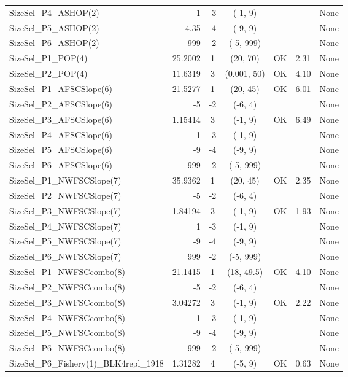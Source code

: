 \documentclass[12pt,]{article}
\begin{document}
\begin{landscape}
\begin{longtable}{lrcccll}
  SizeSel\_P4\_ASHOP(2) & 1 & -3 & (-1, 9) &  &  & None \\ 
  SizeSel\_P5\_ASHOP(2) & -4.35 & -4 & (-9, 9) &  &  & None \\ 
  SizeSel\_P6\_ASHOP(2) & 999 & -2 & (-5, 999) &  &  & None \\ 
  SizeSel\_P1\_POP(4) & 25.2002 & 1 & (20, 70) & OK & 2.31 & None \\ 
  SizeSel\_P2\_POP(4) & 11.6319 & 3 & (0.001, 50) & OK & 4.10 & None \\ 
  SizeSel\_P1\_AFSCSlope(6) & 21.5277 & 1 & (20, 45) & OK & 6.01 & None \\ 
  SizeSel\_P2\_AFSCSlope(6) & -5 & -2 & (-6, 4) &  &  & None \\ 
  SizeSel\_P3\_AFSCSlope(6) & 1.15414 & 3 & (-1, 9) & OK & 6.49 & None \\ 
  SizeSel\_P4\_AFSCSlope(6) & 1 & -3 & (-1, 9) &  &  & None \\ 
  SizeSel\_P5\_AFSCSlope(6) & -9 & -4 & (-9, 9) &  &  & None \\ 
  SizeSel\_P6\_AFSCSlope(6) & 999 & -2 & (-5, 999) &  &  & None \\ 
  SizeSel\_P1\_NWFSCSlope(7) & 35.9362 & 1 & (20, 45) & OK & 2.35 & None \\ 
  SizeSel\_P2\_NWFSCSlope(7) & -5 & -2 & (-6, 4) &  &  & None \\ 
  SizeSel\_P3\_NWFSCSlope(7) & 1.84194 & 3 & (-1, 9) & OK & 1.93 & None \\ 
  SizeSel\_P4\_NWFSCSlope(7) & 1 & -3 & (-1, 9) &  &  & None \\ 
  SizeSel\_P5\_NWFSCSlope(7) & -9 & -4 & (-9, 9) &  &  & None \\ 
  SizeSel\_P6\_NWFSCSlope(7) & 999 & -2 & (-5, 999) &  &  & None \\ 
  SizeSel\_P1\_NWFSCcombo(8) & 21.1415 & 1 & (18, 49.5) & OK & 4.10 & None \\ 
  SizeSel\_P2\_NWFSCcombo(8) & -5 & -2 & (-6, 4) &  &  & None \\ 
  SizeSel\_P3\_NWFSCcombo(8) & 3.04272 & 3 & (-1, 9) & OK & 2.22 & None \\ 
  SizeSel\_P4\_NWFSCcombo(8) & 1 & -3 & (-1, 9) &  &  & None \\ 
  SizeSel\_P5\_NWFSCcombo(8) & -9 & -4 & (-9, 9) &  &  & None \\ 
  SizeSel\_P6\_NWFSCcombo(8) & 999 & -2 & (-5, 999) &  &  & None \\ 
  SizeSel\_P6\_Fishery(1)\_BLK4repl\_1918 & 1.31282 & 4 & (-5, 9) & OK & 0.63 & None \\ 

\end{longtable}
\end{landscape}
\end{document}
